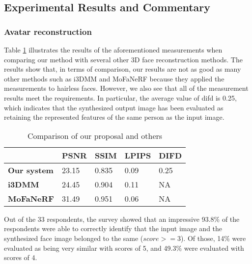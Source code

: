 
\subsection{Experimental Results and Commentary}
\subsubsection{Avatar reconstruction}

Table \ref{loss_stats} illustrates the results of the aforementioned measurements when comparing our method with several other 3D face reconstruction methods. The results show that, in terms of comparison, our results are not as good as many other methods such as i3DMM and MoFaNeRF because they applied the measurements to hairless faces. However, we also see that all of the measurement results meet the requirements. In particular, the average value of \acrshort{difd} is 0.25, which indicates that the synthesized output image has been evaluated as retaining the represented features of the same person as the input image.

\begin{table}[H]
    \centering
    \captionsetup{font=bf}
    \caption{Comparison of our proposal and others}
    \begin{tabularx}{\linewidth}{| X | X | X | X | X |}
        \hline
                            & \textbf{PSNR} & \textbf{SSIM} & \textbf{LPIPS} & \textbf{DIFD} \\ \hline\hline
        \textbf{Our system} & 23.15         & 0.835         & 0.09           & 0.25          \\ \hline %
        \textbf{i3DMM}      & 24.45         & 0.904         & 0.11           & NA            \\ \hline
        \textbf{MoFaNeRF}   & 31.49         & 0.951         & 0.06           & NA            \\ \hline
    \end{tabularx}
    \label{loss_stats}
\end{table}

Out of the 33 respondents, the survey showed that an impressive 93.8\% of the respondents were able to correctly identify that the input image and the synthesized face image belonged to the same  ($score >= 3$). Of those, 14\% were evaluated as being very similar with scores of 5, and 49.3\% were evaluated with scores of 4. %

